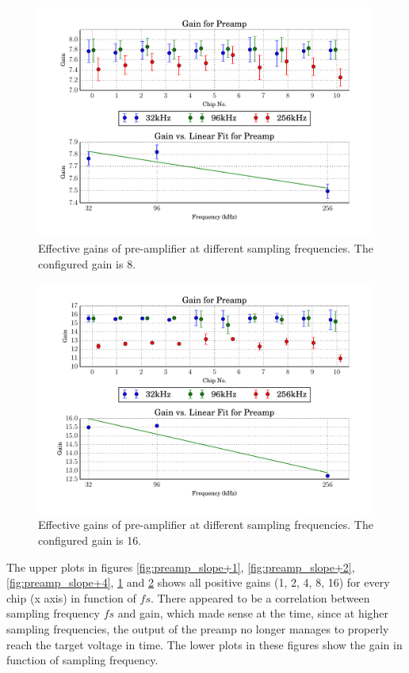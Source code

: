 \begin{figure}
    \centering
    \includegraphics[width=.85\linewidth]{images/plots/dc_slope_preamp_gain+8.pdf}
    \caption{Effective gains of pre-amplifier at different sampling frequencies. The configured gain is 8.}
    \label{fig:preamp_slope+8}
\end{figure}
\begin{figure}
    \centering
    \includegraphics[width=.85\linewidth]{images/plots/dc_slope_preamp_gain+16.pdf}
    \caption{Effective gains of pre-amplifier at different sampling frequencies. The configured gain is 16.}
    \label{fig:preamp_slope+16}
\end{figure}

The upper plots in figures \ref{fig:preamp_slope+1}, \ref{fig:preamp_slope+2},
\ref{fig:preamp_slope+4},             \ref{fig:preamp_slope+8}             and
\ref{fig:preamp_slope+16} shows all positive  gains (1, 2, 4, 8, 16) for every
chip (x axis)  in function of $fs$. There appeared to be a correlation between
sampling frequency $fs$  and  gain,  which  made  sense  at the time, since at
higher sampling  frequencies,  the  output  of the preamp no longer manages to
properly reach the  target  voltage  in time. The lower plots in these figures
show the gain in function of sampling frequency.

